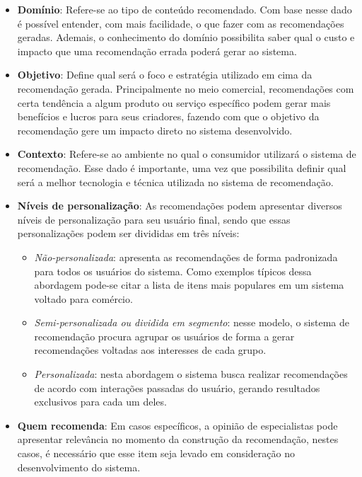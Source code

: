 \begin{itemize}
	\item \textbf{Domínio}: Refere-se ao tipo de conteúdo recomendado. Com base nesse dado é possível entender, com mais facilidade, o que fazer com as recomendações geradas. Ademais, o conhecimento do domínio possibilita saber qual o custo e impacto que uma recomendação errada poderá gerar ao sistema.
	
	\item \textbf{Objetivo}: Define qual será o foco e estratégia utilizado em cima da recomendação gerada. Principalmente no meio comercial, recomendações com certa tendência a algum produto ou serviço específico podem gerar mais benefícios e lucros para seus criadores, fazendo com que o objetivo da recomendação gere um impacto direto no sistema desenvolvido.
	
	\item \textbf{Contexto}: Refere-se ao ambiente no qual o consumidor utilizará o sistema de recomendação. Esse dado é importante, uma vez que possibilita definir qual será a melhor tecnologia e técnica utilizada no sistema de recomendação. 
	
	\item \textbf{Níveis de personalização}: As recomendações podem apresentar diversos níveis de personalização para seu usuário final, sendo que essas personalizações podem ser divididas em três níveis:
	
	\begin{itemize}
		\item \textit{Não-personalizada}: apresenta as recomendações de forma padronizada para todos os usuários do sistema. Como exemplos típicos dessa abordagem pode-se citar a lista de itens mais populares em um sistema voltado para comércio.
		
		\item \textit{Semi-personalizada ou dividida em segmento}: nesse modelo, o sistema de recomendação procura agrupar os usuários de forma a gerar recomendações voltadas aos interesses de cada grupo.
		
		\item \textit{Personalizada}: nesta abordagem o sistema busca realizar recomendações de acordo com interações passadas do usuário, gerando resultados exclusivos para cada um deles.
	\end{itemize}

	\item \textbf{Quem recomenda}: Em casos específicos, a opinião de especialistas pode apresentar relevância no momento da construção da recomendação, nestes casos, é necessário que esse item seja levado em consideração no desenvolvimento do sistema.
	

\end{itemize}
